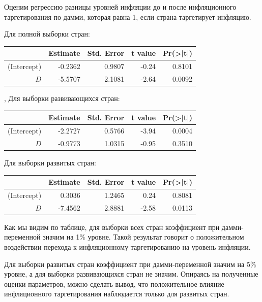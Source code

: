 \documentclass[a4paper,12pt]{article} %
\begin{document}
Оценим регрессию разницы уровней инфляции до и после инфляционного таргетирования по дамми, которая равна 1, если страна таргетирует инфляцию.


Для полной выборки стран:

\begin{table}[h!]
	\centering
	\begin{tabular}{rrrrr}
		\hline
		& Estimate & Std. Error & t value & Pr(>|t|) \\ 
		\hline
		(Intercept) & -0.2362 & 0.9807 & -0.24 & 0.8101 \\ 
		$ D $ & -5.5707 & 2.1081 & -2.64 & 0.0092 \\ 
		\hline
	\end{tabular}
\end{table}

,
Для выборки развивающихся стран:

\begin{table}[h!]
	\centering
	\begin{tabular}{rrrrr}
		\hline
		& Estimate & Std. Error & t value & Pr(>|t|) \\ 
		\hline
		(Intercept) & -2.2727 & 0.5766 & -3.94 & 0.0004 \\ 
		$ D $ & -0.9773 & 1.0315 & -0.95 & 0.3510 \\ 
		\hline
		\end{tabular}
		\end{table}


Для выборки развитых стран:

\begin{table}[h!]
	\centering
	\begin{tabular}{rrrrr}
		\hline
		& Estimate & Std. Error & t value & Pr(>|t|) \\ 
		\hline
		(Intercept) & 0.3036 & 1.2465 & 0.24 & 0.8081 \\ 
		$ D $ & -7.4562 & 2.8881 & -2.58 & 0.0113 \\ 
		\hline
		\end{tabular}
		\end{table}
	
	
	
Как мы видим по таблице, для выборки всех стран коэффициент при дамми-переменной значим на 1\% уровне.
Такой результат говорит о  положительном воздействии перехода к инфляционному таргетированию на уровень инфляции. 


Для выборки развитых стран коэффициент при дамми-переменной значим на 5\% уровне, а для  выборки развивающихся стран не значим. Опираясь на полученные оценки параметров, можно сделать вывод, что положительное влияние инфляционного таргетирования наблюдается только для развитых стран.
\end{document}
